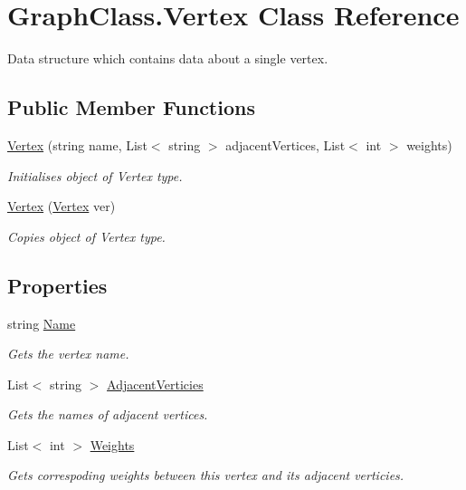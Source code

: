 \hypertarget{class_graph_class_1_1_vertex}{}\section{Graph\+Class.\+Vertex Class Reference}
\label{class_graph_class_1_1_vertex}


Data structure which contains data about a single vertex.  


\subsection*{Public Member Functions}
\begin{DoxyCompactItemize}
\item 
\hyperlink{class_graph_class_1_1_vertex_ab2dd1a9c310f3af7549e9c3051b91f99}{Vertex} (string name, List$<$ string $>$ adjacent\+Vertices, List$<$ int $>$ weights)
\begin{DoxyCompactList}\small\item\em Initialises object of {\itshape Vertex}  type. \end{DoxyCompactList}\item 
\hyperlink{class_graph_class_1_1_vertex_a94f75ff502807717ef2119f4f433a9a9}{Vertex} (\hyperlink{class_graph_class_1_1_vertex}{Vertex} ver)
\begin{DoxyCompactList}\small\item\em Copies object of {\itshape Vertex}  type. \end{DoxyCompactList}\end{DoxyCompactItemize}
\subsection*{Properties}
\begin{DoxyCompactItemize}
\item 
string \hyperlink{class_graph_class_1_1_vertex_a218ad4b509e5c08d080eb2d705fd9ccb}{Name}
\begin{DoxyCompactList}\small\item\em Gets the vertex name. \end{DoxyCompactList}\item 
List$<$ string $>$ \hyperlink{class_graph_class_1_1_vertex_ab943a98fd4ea8faf7056f9388c5f9bef}{Adjacent\+Verticies}
\begin{DoxyCompactList}\small\item\em Gets the names of adjacent vertices. \end{DoxyCompactList}\item 
List$<$ int $>$ \hyperlink{class_graph_class_1_1_vertex_ad0c0d9ff9480f322a49d87257a269257}{Weights}
\begin{DoxyCompactList}\small\item\em Gets correspoding weights between this vertex and its adjacent verticies. \end{DoxyCompactList}\end{DoxyCompactItemize}


